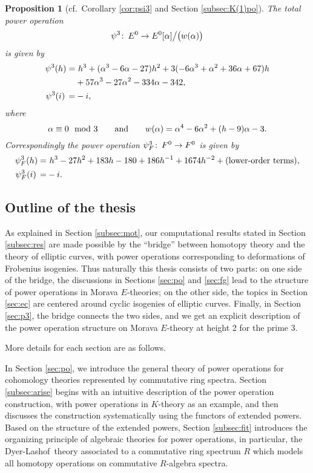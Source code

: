 \documentclass{gtpart}
\newtheorem{prop}[thm]{Proposition}
\theoremstyle{definition}
\theoremstyle{remark}
\def\co{\colon\thinspace}
\newcommand{\DL}{Dyer-Lashof~}
\newcommand{\md}{~~{\rm mod}~}
\newcommand{\ad}{{\rm and}}
\newcommand{\A}{\alpha}
\newcommand{\p}{\psi^3}
\numberwithin{equation}{section}
\numberwithin{thm}{section}
\begin{document}
\begin{prop}[cf.~Corollary \ref{cor:psi3} and Section \ref{subsec:K(1)po}]
 The total power operation 
 \[
  \p \co E^0 \to E^0 [\A] \big/ \big( w(\A) \big) 
 \]
 is given by 
 \begin{equation*}
 \begin{split}
  \p(h) = & ~ h^3 + (\A^3 - 6 \A - 27) h^2 + 3 (-6 \A^3 + \A^2 + 36 \A + 67) h \\
          & + 57 \A^3 - 27 \A^2 - 334 \A - 342, \\
  \p(i) \thinspace = & -i, 
 \end{split}
 \end{equation*}
 where 
 \[
  \A \equiv 0 \md 3 \qquad \ad \qquad 
  w(\A) = \A^4 - 6 \A^2 + (h - 9) \A - 3.  
 \]
 Correspondingly the power operation $\p_F \co F^0 \to F^0$ is given by 
 \begin{equation*}
 \begin{split}
  \psi_F^3(h) = & ~ h^3 - 27 h^2 + 183 h - 180 + 186 h^{-1} + 1674 h^{-2} + (\text{lower-order terms}), \\
  \psi_F^3(i) \thinspace = & -i.  
 \end{split}
 \end{equation*}
\end{prop}


\subsection{Outline of the thesis}

As explained in Section \ref{subsec:mot}, our computational results 
stated in Section \ref{subsec:res} are made possible by the ``bridge'' 
between homotopy theory and the theory of elliptic curves, with power 
operations corresponding to deformations of Frobenius isogenies.  Thus 
naturally this thesis consists of two parts: on one side of the bridge, 
the discussions in Sections \ref{sec:po} and \ref{sec:fg} lead to the 
structure of power operations in Morava $E$-theories; on the other side, 
the topics in Section \ref{sec:ec} are centered around cyclic isogenies 
of elliptic curves.  Finally, in Section \ref{sec:p3}, the bridge 
connects the two sides, and we get an explicit description of the power 
operation structure on Morava $E$-theory at height 2 for the prime 3.  

More details for each section are as follows.  

In Section \ref{sec:po}, we introduce the general theory of power 
operations for cohomology theories represented by commutative ring 
spectra.  Section \ref{subsec:arise} begins with an intuitive 
description of the power operation construction, with power operations 
in $K$-theory as an example, and then discusses the construction 
systematically using the functors of extended powers.  Based on the 
structure of the extended powers, Section \ref{subsec:fit} introduces 
the organizing principle of algebraic theories for power operations, in 
particular, the \DL theory associated to a commutative ring spectrum $R$ 
which models all homotopy operations on commutative $R$-algebra spectra.  
\end{document}

